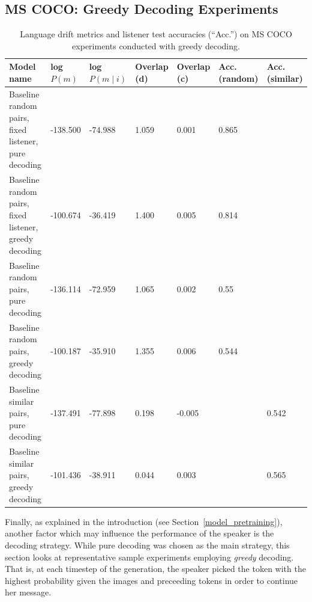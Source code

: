 \subsection{MS COCO: Greedy Decoding Experiments}
\label{expt:coco_greedy}
\begin{table}[]
	\begin{tabularx}{\linewidth}{|X|l|l|X|X|X|X|}
		\hline
			\textbf{Model name}                                    & \textbf{log $P(m)$} & \textbf{log $P(m \mid i)$} & \textbf{Overlap (d)} & \textbf{Overlap (c)} & \textbf{Acc. (random)} & \textbf{Acc. (similar)} \\ \hline
			 Baseline random pairs, fixed listener, pure decoding   &     -138.500         &         -74.988               &       1.059            &      0.001               &       0.865          &                \\ \hline
			 Baseline random pairs, fixed listener, greedy decoding   &     -100.674     &         -36.419              &       1.400       &      0.005             &       0.814          &                \\ \hline
			 Baseline random pairs, pure decoding   & -136.114        &      -72.959            &       1.065          &      0.002               &       0.55          &                \\ \hline
			 Baseline random pairs, greedy decoding   &-100.187      &    -35.910            &       1.355          &      0.006            &       0.544         &                \\ \hline
			 Baseline similar pairs, pure decoding   &     -137.491& -77.898    & 0.198    &   -0.005    &            &  0.542        \\ \hline
			 Baseline similar pairs, greedy decoding   &   -101.436  &      -38.911        &     0.044   &     0.003     &            &     0.565           \\ \hline
			 
	\end{tabularx}
\caption{\label{tab:coco_greedy}Language drift metrics and listener test accuracies (``Acc.'') on MS COCO experiments conducted with greedy decoding.}
\end{table}

Finally, as explained in the introduction (see Section~\ref{model_pretraining}), another factor which may influence the performance of the speaker is the decoding strategy. While pure decoding was chosen as the main strategy, this section looks at representative sample experiments employing \emph{greedy} decoding. That is, at each timestep of the generation, the speaker picked the token with the highest probability given the images and preceeding tokens in order to continue her message. 

